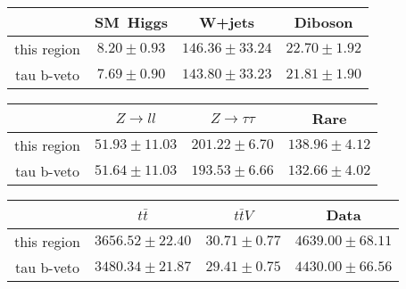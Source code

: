 \centering
\begin{tabular}{|c|c|c|c|} \hline
 & SM~Higgs & W+jets & Diboson\\\hline
this region & $8.20\pm0.93$ & $146.36\pm33.24$ & $22.70\pm1.92$\\\hline
tau b-veto & $7.69\pm0.90$ & $143.80\pm33.23$ & $21.81\pm1.90$\\\hline
\end{tabular}
\begin{tabular}{|c|c|c|c|} \hline
 & $Z\to ll$ & $Z\to \tau\tau$ & Rare\\\hline
this region & $51.93\pm11.03$ & $201.22\pm6.70$ & $138.96\pm4.12$\\\hline
tau b-veto & $51.64\pm11.03$ & $193.53\pm6.66$ & $132.66\pm4.02$\\\hline
\end{tabular}
\begin{tabular}{|c|c|c|c|} \hline
 & $t\bar{t}$ & $t\bar{t}V$ & Data\\\hline
this region & $3656.52\pm22.40$ & $30.71\pm0.77$ & $4639.00\pm68.11$\\\hline
tau b-veto & $3480.34\pm21.87$ & $29.41\pm0.75$ & $4430.00\pm66.56$\\\hline
\end{tabular}
